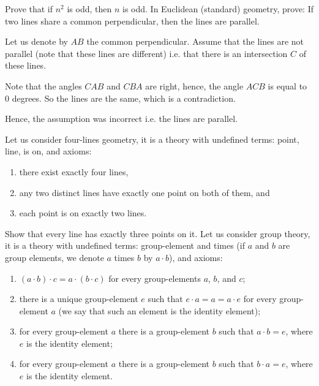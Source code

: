 \begin{chapterendexercises}
    \exercise[recommended] Prove that if $n^2$ is odd, then $n$ is odd.
    \exercise  In Euclidean (standard) geometry, prove: If two lines share a
        common perpendicular, then the lines are parallel.
        \begin{solution}
          Let us denote by $AB$ the common perpendicular. Assume that the lines
          are not parallel (note that these lines are different) i.e. that there
          is an intersection $C$ of these lines.

          Note that the angles $CAB$ and $CBA$ are right, hence, the angle $ACB$
          is equal to $0$ degrees. So the lines are the same, which is a
          contradiction. 

          Hence, the assumption was incorrect i.e. the lines are parallel.
        \end{solution}
    \exercise[recommended] Let us consider four-lines geometry, it is a theory with
        undefined terms: point, line, is on, and axioms:
        \begin{enumerate}
            \item there exist exactly four lines,
            \item any two distinct lines have exactly one point on both of them, and
            \item each point is on exactly two lines.
        \end{enumerate}

        Show that every line has exactly three points on it.
    \exercise Let us consider group theory, it is a theory with undefined
        terms: group-element and times (if $a$ and $b$ are group elements,
        we denote $a$ times $b$ by $a \cdot b$), and axioms:
        \begin{enumerate}
          \item $(a \cdot b) \cdot c = a \cdot (b \cdot c)$
            for every group-elements $a$, $b$, and $c$;
          \item there is a unique group-element $e$ such that
            $e \cdot a = a = a \cdot e$ for every group-element $a$
            (we say that such an element is the identity element);
          \item for every group-element $a$ there is a group-element $b$
            such that $a \cdot b = e$, where $e$ is the identity element;
          \item for every group-element $a$ there is a group-element $b$
            such that $b \cdot a = e$, where $e$ is the identity element.
        \end{enumerate}


\end{chapterendexercises}
